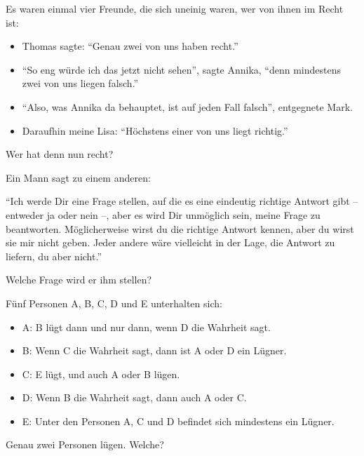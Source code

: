 \documentclass{zusammenfassung}
\begin{document}
\begin{aufgabe}
Es waren einmal vier Freunde, die sich uneinig waren, wer von ihnen im Recht ist:

\begin{itemize}
  \item Thomas sagte: "`Genau zwei von uns haben recht."'
  \item "`So eng würde ich das jetzt nicht sehen"', sagte Annika, "`denn mindestens zwei von uns liegen falsch."'
  \item "`Also, was Annika da behauptet, ist auf jeden Fall falsch"', entgegnete Mark.
  \item Daraufhin meine Lisa: "`Höchstens einer von uns liegt richtig."'
\end{itemize}

Wer hat denn nun recht?
\end{aufgabe}
\enlargethispage{3cm}

\begin{aufgabe}
  Ein Mann sagt zu einem anderen:

  "`Ich werde Dir eine Frage stellen, auf die es eine eindeutig richtige Antwort gibt -- entweder ja oder nein --, aber es wird Dir
  unmöglich sein, meine Frage zu beantworten. Möglicherweise wirst du die richtige Antwort kennen, aber du wirst sie mir nicht
  geben. Jeder andere wäre vielleicht in der Lage, die Antwort zu liefern, du aber nicht."'

  Welche Frage wird er ihm stellen?
\end{aufgabe}

\begin{aufgabe}
  Fünf Personen A, B, C, D und E unterhalten sich:
  
  \begin{itemize}
    \item A: B lügt dann und nur dann, wenn D die Wahrheit sagt.
    \item B: Wenn C die Wahrheit sagt, dann ist A oder D ein Lügner.
    \item C: E lügt, und auch A oder B lügen.
    \item D: Wenn B die Wahrheit sagt, dann auch A oder C.
    \item E: Unter den Personen A, C und D befindet sich mindestens ein Lügner.
  \end{itemize}
  
  Genau zwei Personen lügen. Welche?
\end{aufgabe}
\end{document}
